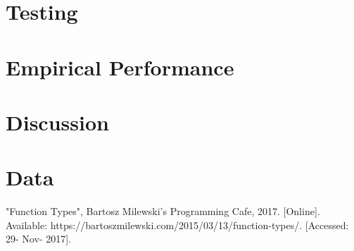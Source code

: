 \documentclass[conference]{IEEEtran}
\begin{document}
\section{Testing}
\section{Empirical Performance}
\section{Discussion}
\section{Data}
\begin{thebibliography}{00}
 "Function Types", Bartosz Milewski's Programming Cafe, 2017. [Online]. Available: https://bartoszmilewski.com/2015/03/13/function-types/. [Accessed: 29- Nov- 2017].
\end{thebibliography}
\end{document}
